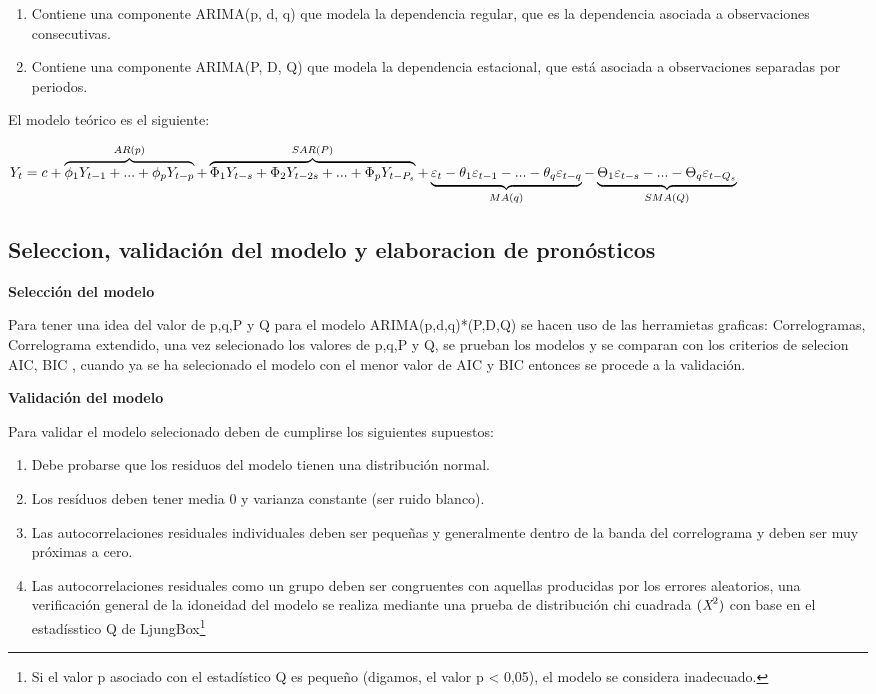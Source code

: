\documentclass[12pt,letterpaper]{report}
\begin{document}
\begin{enumerate}

\item Contiene una componente ARIMA(p, d, q) que modela la dependencia regular, que es la dependencia asociada a observaciones consecutivas.

\item Contiene una componente ARIMA(P, D, Q) que modela la dependencia estacional, que está asociada a observaciones separadas por periodos.

\end{enumerate}

El modelo teórico es el siguiente:


$Y_t = c + \overbrace{\phi_1 Y_{t-1}+ ... + \phi_p Y_{t-p}}^{AR(p)}+ \overbrace{\Phi_1 Y_{t-s}+\Phi_2 Y_{t-2s}+...+\Phi_p Y_{t-P_s}}^{SAR(P)} + \\ \underbrace{\varepsilon_t - \theta_1 \varepsilon_{t-1} -...- \theta_q \varepsilon_{t-q}}_{MA(q)} - \underbrace{\Theta_1 \varepsilon_{t-s} - ... - \Theta_q\varepsilon_{t-Q_s}}_{SMA(Q)}$



\subsection{Seleccion, validación del modelo y elaboracion de pronósticos}

\textbf{Selección del modelo}

Para tener una idea del valor de p,q,P y Q para el modelo ARIMA(p,d,q)*(P,D,Q) se hacen uso de las herramietas graficas: Correlogramas, Correlograma extendido, una vez selecionado los valores de p,q,P y Q, se prueban los modelos y se comparan con los criterios de selecion AIC, BIC \cite{Shumway}, cuando ya se ha selecionado el modelo con el menor valor de AIC y BIC entonces se procede a la validación.

\textbf{Validación del modelo}

Para validar el modelo selecionado deben de cumplirse los siguientes supuestos:

\begin{enumerate}
 \item Debe probarse que los residuos del modelo tienen una distribución normal. 
 \item Los resíduos deben tener media 0 y varianza constante (ser ruido blanco).
 \item Las autocorrelaciones residuales individuales deben ser pequeñas y generalmente dentro de         la banda del correlograma y deben ser muy próximas a cero.
 \item Las autocorrelaciones residuales como un grupo deben ser congruentes con aquellas producidas por los errores aleatorios, una verificación
general de la idoneidad del modelo se realiza mediante una prueba de
distribución chi cuadrada $(\emph{X}^2)$ con base en el estadísstico Q de LjungBox\footnote{Si el valor p asociado con el estadístico Q es pequeño (digamos, el valor
p < 0,05), el modelo se considera inadecuado.}

\end{enumerate}
\end{document}
